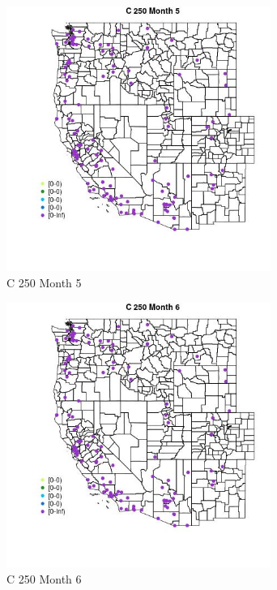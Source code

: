 \begin{figure} 
\centering  
\includegraphics[width=0.77\textwidth]{Code_Outputs/Report_ML_input_PM25_Step4_part_e_de_duplicated_aves_MapObsMo5C_250.jpg} 
\caption{\label{fig:Report_ML_input_PM25_Step4_part_e_de_duplicated_avesMapObsMo5C_250}C 250 Month 5} 
\end{figure} 
 

\begin{figure} 
\centering  
\includegraphics[width=0.77\textwidth]{Code_Outputs/Report_ML_input_PM25_Step4_part_e_de_duplicated_aves_MapObsMo6C_250.jpg} 
\caption{\label{fig:Report_ML_input_PM25_Step4_part_e_de_duplicated_avesMapObsMo6C_250}C 250 Month 6} 
\end{figure} 
 

